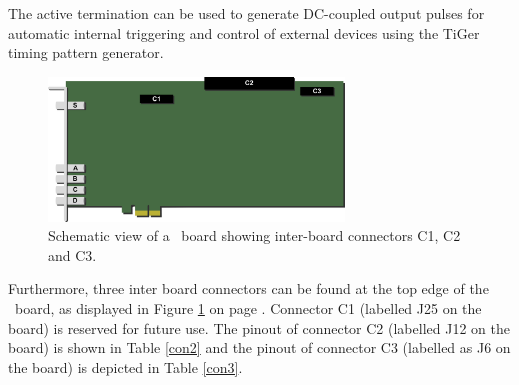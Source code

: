 	The active termination can be used to generate DC-coupled output pulses for automatic internal triggering and control of external devices using the TiGer timing pattern generator.
		\begin{figure}[ht]
			\begin{center}
				\includegraphics[width=0.7\textwidth]{figures/xTDC4_schematic.pdf}
				\caption{Schematic view of a \deviceName\ board showing inter-board connectors C1, C2 and C3.\label{fig:schematics}}
			\end{center}
		\end{figure}

	Furthermore, three inter board connectors can be found at the top edge of the \deviceName\ board, as displayed in Figure \ref{fig:schematics} on page \pageref{fig:schematics}. 
	Connector C1 (labelled J25 on the board) is reserved for future use. The pinout of connector C2 (labelled J12 on the board) is shown in Table \ref{con2} and the pinout of connector C3 (labelled as J6 on the board) is depicted in Table \ref{con3}.


